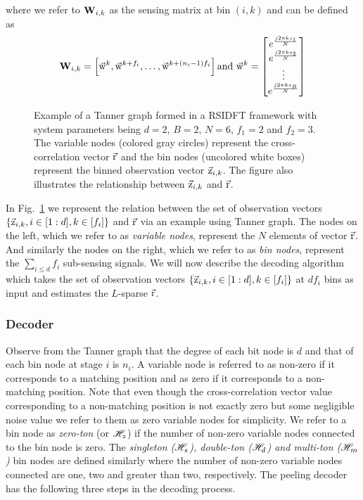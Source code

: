 \documentclass[journal,11pt,onecolumn]{IEEEtran}  %
\begin{document}
where we refer to $\mathbf{W}_{i,k}$ as the sensing matrix at bin $(i,k)$ and can be defined as  
\begin{align}\label{Eqn:Sensing Matrix}
	\mathbf{W}_{i,k} = \left[\vec{\mathrm{w}}^{k},\vec{\mathrm{w}}^{k+f_i},\ldots, \vec{\mathrm{w}}^{k+(n_i-1)f_i}\right] \text{and} ~\vec{\mathrm{w}}^{k}=
	\begin{bmatrix}
		e^{\frac{j2\pi ks_1}{N}}\\
		e^{\frac{j2\pi ks_2}{N}}\\
		\vdots\\
		e^{\frac{j2\pi ks_B}{N}}
	\end{bmatrix}
\end{align}

\begin{figure}[h!]
	\begin{center}
	 	\resizebox{0.75\textwidth}{!}{}	
	\end{center}	   
	\caption{Example of a Tanner graph formed in a RSIDFT framework with system parameters being $d=2$, $B=2$, $N=6$, $f_1 = 2$ and $f_2=3$. The variable nodes (colored gray circles) represent the cross-correlation vector $\vec{\mathrm{r}}$ and the bin nodes (uncolored white boxes) represent the binned observation vector $\vec{\mathrm{z}}_{i,k}$. The figure also illustrates the relationship between $\vec{\mathrm{z}}_{i,k}$ and $\vec{\mathrm{r}}$.}\label{fig:factorgraph}
	\vspace{5 pt}
\end{figure}

In Fig.~\ref{fig:factorgraph} we represent the relation between the set of observation vectors $\{\vec{\mathrm{z}}_{i,k},i\in[1:d],k\in[f_i]\}$ and $\vec{\mathrm{r}}$ via an example using Tanner graph. The nodes on the left, which we refer to as {\it variable nodes}, represent the $N$ elements of vector $\vec{\mathrm{r}}$. And similarly the nodes on the right, which we refer to as {\it bin nodes}, represent the $\sum_{i\leq d} f_i$ sub-sensing signals. We will now describe the decoding algorithm which takes the set of observation vectors $\{\vec{\mathrm{z}}_{i,k},i\in[1:d],k\in[f_i]\}$ at $df_i$ bins as input and estimates the $L$-sparse $\vec{\mathrm{r}}$.	 

\subsubsection{Decoder}		
	Observe from the Tanner graph that the degree of each bit node is $d$ and that of each bin node at stage $i$ is $n_i$. A variable node is referred to as non-zero if it corresponds to a matching position and as zero if it corresponds to a non-matching position. Note that even though the cross-correlation vector value corresponding to a non-matching position is not exactly zero but some negligible noise value we refer to them as zero variable nodes for simplicity. We refer to a bin node as {\it zero-ton} (or $\mathscr{H}_z$) if the number of non-zero variable nodes connected to the bin node is zero. The {\it singleton ($\mathscr{H}_s$), double-ton ($\mathscr{H}_d$) and multi-ton ($\mathscr{H}_m$)} bin nodes are defined similarly where the number of non-zero variable nodes connected are one, two and greater than two, respectively. The peeling decoder has the following three steps in the decoding process.
\end{document}
